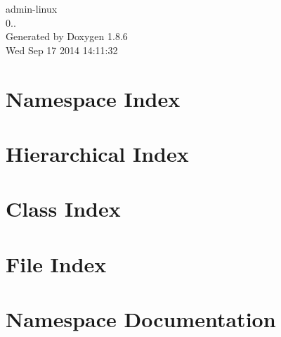 \documentclass[twoside]{book}
\newcommand{\clearemptydoublepage}{%
  \newpage{\pagestyle{empty}\cleardoublepage}%
}
\begin{document}
\hypersetup{pageanchor=false}
\begin{titlepage}
\vspace*{7cm}
\begin{center}%
{\Large admin-\/linux \\[1ex]\large 0.. }\\
\vspace*{1cm}
{\large Generated by Doxygen 1.8.6}\\
\vspace*{0.5cm}
{\small Wed Sep 17 2014 14:11:32}\\
\end{center}
\end{titlepage}
\clearemptydoublepage
\tableofcontents
\clearemptydoublepage
{}
\hypersetup{pageanchor=true}

\chapter{Namespace Index}

\chapter{Hierarchical Index}

\chapter{Class Index}

\chapter{File Index}

\chapter{Namespace Documentation}






















\end{document}
